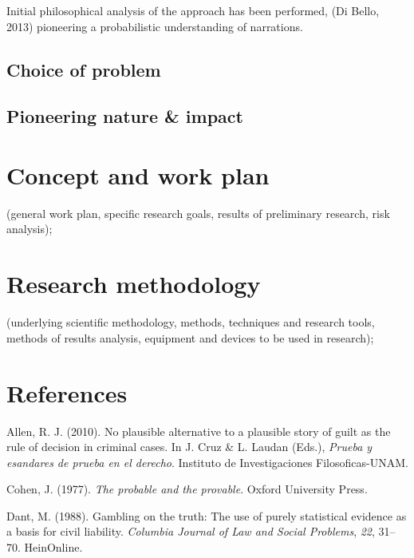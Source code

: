 \documentclass[11pt,dvipsnames,enabledeprecatedfontcommands]{scrartcl}
\begin{document}
Initial philosophical analysis of the approach has been performed, (Di
Bello, 2013) pioneering a probabilistic understanding of narrations.


\subsection{Choice of problem}\label{choice-of-problem}

\subsection{Pioneering nature \& impact}\label{pioneering-nature-impact}

\section{Concept and work plan}\label{concept-and-work-plan}

(general work plan, specific research goals, results of preliminary
research, risk analysis);

\section{Research methodology}\label{research-methodology}

(underlying scientific methodology, methods, techniques and research
tools, methods of results analysis, equipment and devices to be used in
research);

\section*{References}\label{references}

\hypertarget{refs}{}
\hypertarget{ref-Allen2010No-Plausible-Al}{}
Allen, R. J. (2010). No plausible alternative to a plausible story of
guilt as the rule of decision in criminal cases. In J. Cruz \& L. Laudan
(Eds.), \emph{Prueba y esandares de prueba en el derecho}. Instituto de
Investigaciones Filosoficas-UNAM.

\hypertarget{ref-Cohen1977The-probable-an}{}
Cohen, J. (1977). \emph{The probable and the provable}. Oxford
University Press.

\hypertarget{ref-dant1988gambling}{}
Dant, M. (1988). Gambling on the truth: The use of purely statistical
evidence as a basis for civil liability. \emph{Columbia Journal of Law
and Social Problems}, \emph{22}, 31--70. HeinOnline.
\end{document}
